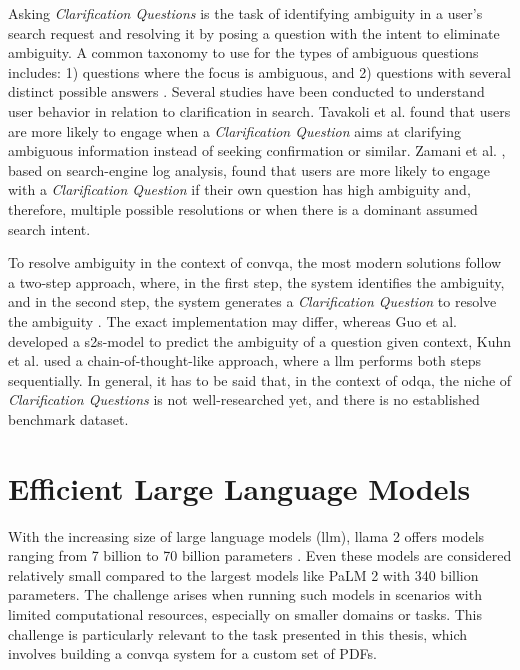 Asking \textit{Clarification Questions} is the task of identifying ambiguity in a user's search request and resolving it by posing a question with the intent to eliminate ambiguity. A common taxonomy to use for the types of ambiguous questions includes: 1) questions where the focus is ambiguous, and 2) questions with several distinct possible answers \cite{larsson_issue-based_2002}. Several studies have been conducted to understand user behavior in relation to clarification in search. Tavakoli et al. \cite{tavakoli_analyzing_2021} found that users are more likely to engage when a \textit{Clarification Question} aims at clarifying ambiguous information instead of seeking confirmation or similar. Zamani et al. \cite{zamani_analyzing_2020}, based on search-engine log analysis, found that users are more likely to engage with a \textit{Clarification Question} if their own question has high ambiguity and, therefore, multiple possible resolutions or when there is a dominant assumed search intent.

To resolve ambiguity in the context of \gls{convqa}, the most modern solutions follow a two-step approach, where, in the first step, the system identifies the ambiguity, and in the second step, the system generates a \textit{Clarification Question} to resolve the ambiguity \cite{kuhn_clam_2023, guo_abg-coqa_nodate}. The exact implementation may differ, whereas Guo et al. \cite{guo_abg-coqa_nodate} developed a \gls{s2s}-model to predict the ambiguity of a question given context, Kuhn et al. \cite{kuhn_clam_2023} used a chain-of-thought-like approach, where a \gls{llm} performs both steps sequentially. In general, it has to be said that, in the context of \gls{odqa}, the niche of \textit{Clarification Questions} is not well-researched yet, and there is no established benchmark dataset.

\section{Efficient Large Language Models}
\label{sec:efficient_llm}

With the increasing size of large language models (\gls{llm}), \gls{llama} 2 offers models ranging from 7 billion to 70 billion parameters \cite{touvron_llama_2023}. Even these models are considered relatively small compared to the largest models like PaLM 2 \cite{anil_palm_2023} with 340 billion parameters. The challenge arises when running such models in scenarios with limited computational resources, especially on smaller domains or tasks. This challenge is particularly relevant to the task presented in this thesis, which involves building a \gls{convqa} system for a custom set of PDFs.

